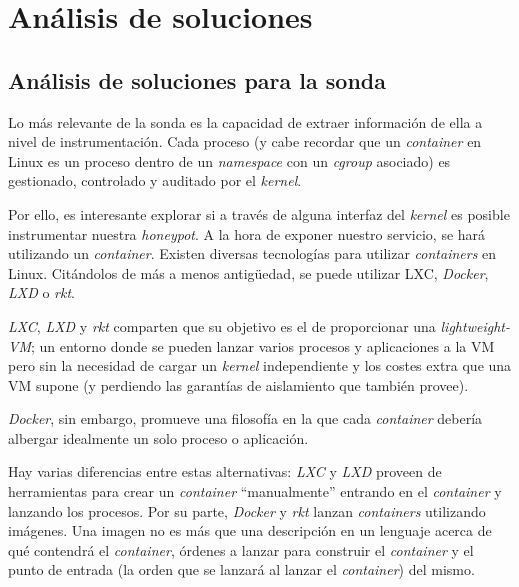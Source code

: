 \begin{itemize}
    
    
    
    
    
\end{itemize}

\chapter{An\'alisis de soluciones}
\label{chapter:analisis-de-soluciones}
\minitoc{}


\section{An\'alisis de soluciones para la sonda}
\label{sec:analisis-sonda}


Lo más relevante de la sonda es la capacidad de extraer información de ella a nivel de instrumentación. Cada proceso (y cabe recordar que un \emph{container} en Linux es un proceso dentro de un \emph{namespace} con un \emph{cgroup} asociado) es gestionado, controlado
y auditado por el \emph{kernel}.

Por ello, es interesante explorar si a través de alguna interfaz del \emph{kernel} es posible instrumentar nuestra \emph{honeypot}. A la hora de exponer nuestro servicio, se hará utilizando
un \emph{container}. Existen diversas tecnologías para utilizar \emph{containers} en Linux. Citándolos de más a menos antigüedad, se puede utilizar LXC, \emph{Docker}, \emph{LXD} o \emph{rkt}.

\emph{LXC}, \emph{LXD} y \emph{rkt} comparten que su objetivo es el de proporcionar una \emph{lightweight-VM}; un entorno donde se pueden lanzar varios procesos y aplicaciones a la VM
pero sin la necesidad de cargar un \emph{kernel} independiente y los costes extra que una VM supone (y perdiendo las garantías de aislamiento que también provee).

\emph{Docker}, sin embargo, promueve una filosofía en la que cada \emph{container} debería albergar idealmente un solo proceso o aplicación.

Hay varias diferencias entre estas alternativas: \emph{LXC} y \emph{LXD} proveen de herramientas para crear un \emph{container} ``manualmente'' entrando en el \emph{container} y lanzando los procesos. Por su parte, \emph{Docker} y \emph{rkt}
lanzan \emph{containers} utilizando imágenes. Una imagen no es más que una descripción en un lenguaje acerca de qué contendrá el \emph{container}, órdenes a lanzar para construir el \emph{container} y el punto de entrada (la orden que se lanzará al lanzar el \emph{container}) del mismo.

